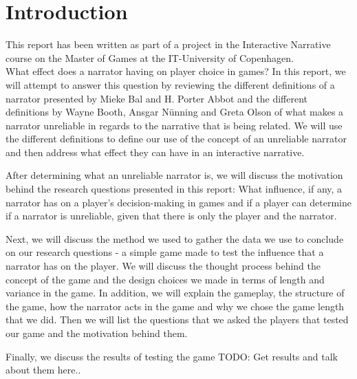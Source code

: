 \section{Introduction}
\label{Introduction}

This report has been written as part of a project in the Interactive Narrative course on the Master of Games at the IT-University of Copenhagen.\\

What effect does a narrator having on player choice in games? In this report, we will attempt to answer this question by reviewing the different definitions of a narrator presented by Mieke Bal and H. Porter Abbot and the different definitions by Wayne Booth, Ansgar N\"unning and Greta Olson of what makes a narrator unreliable in regards to the narrative that is being related. We will use the different definitions to define our use of the concept of an unreliable narrator and then address what effect they can have in an interactive narrative.

After determining what an unreliable narrator is, we will discuss the motivation behind the research questions presented in this report: What influence, if any, a narrator has on a player's decision-making in games and if a player can determine if a narrator is unreliable, given that there is only the player and the narrator. 

Next, we will discuss the method we used to gather the data we use to conclude on our research questions - a simple game made to test the influence that a narrator has on the player. We will discuss the thought process behind the concept of the game and the design choices we made in terms of length and variance in the game. In addition, we will explain the gameplay, the structure of the game, how the narrator acts in the game and why we chose the game length that we did. Then we will list the questions that we asked the players that tested our game and the motivation behind them.

Finally, we discuss the results of testing the game TODO: Get results and talk about them here..